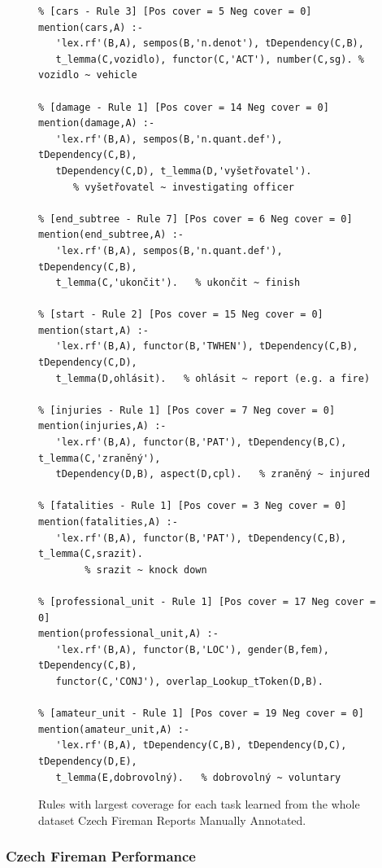 \documentclass[12pt,a4paper,twoside,notitlepage]{article}
\begin{document}
\begin{figure}
\begin{verbatim}
% [cars - Rule 3] [Pos cover = 5 Neg cover = 0]
mention(cars,A) :-
   'lex.rf'(B,A), sempos(B,'n.denot'), tDependency(C,B),
   t_lemma(C,vozidlo), functor(C,'ACT'), number(C,sg). % vozidlo ~ vehicle

% [damage - Rule 1] [Pos cover = 14 Neg cover = 0]
mention(damage,A) :-
   'lex.rf'(B,A), sempos(B,'n.quant.def'), tDependency(C,B),
   tDependency(C,D), t_lemma(D,'vyšetřovatel').   
      % vyšetřovatel ~ investigating officer

% [end_subtree - Rule 7] [Pos cover = 6 Neg cover = 0]
mention(end_subtree,A) :-
   'lex.rf'(B,A), sempos(B,'n.quant.def'), tDependency(C,B),
   t_lemma(C,'ukončit').   % ukončit ~ finish

% [start - Rule 2] [Pos cover = 15 Neg cover = 0]
mention(start,A) :-
   'lex.rf'(B,A), functor(B,'TWHEN'), tDependency(C,B), tDependency(C,D), 
   t_lemma(D,ohlásit).   % ohlásit ~ report (e.g. a fire)

% [injuries - Rule 1] [Pos cover = 7 Neg cover = 0]
mention(injuries,A) :-
   'lex.rf'(B,A), functor(B,'PAT'), tDependency(B,C), t_lemma(C,'zraněný'), 
   tDependency(D,B), aspect(D,cpl).   % zraněný ~ injured

% [fatalities - Rule 1] [Pos cover = 3 Neg cover = 0]
mention(fatalities,A) :-
   'lex.rf'(B,A), functor(B,'PAT'), tDependency(C,B), t_lemma(C,srazit).
	    % srazit ~ knock down

% [professional_unit - Rule 1] [Pos cover = 17 Neg cover = 0]
mention(professional_unit,A) :-
   'lex.rf'(B,A), functor(B,'LOC'), gender(B,fem), tDependency(C,B), 
   functor(C,'CONJ'), overlap_Lookup_tToken(D,B).

% [amateur_unit - Rule 1] [Pos cover = 19 Neg cover = 0]
mention(amateur_unit,A) :-
   'lex.rf'(B,A), tDependency(C,B), tDependency(D,C), tDependency(D,E), 
   t_lemma(E,dobrovolný).   % dobrovolný ~ voluntary
\end{verbatim}
	\caption[Rules with largest coverage for each task.]{Rules with largest coverage for each task learned from the whole dataset Czech Fireman Reports Manually Annotated.}
	\label{fig:learning_eval_rules}
\end{figure}


\subsubsection{Czech Fireman Performance}
\end{document}
